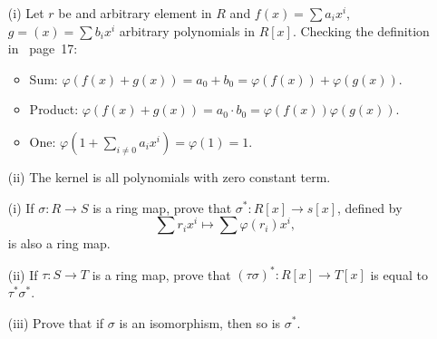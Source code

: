 \begin{myenumerate}
\begin{itemize}
 \item[(i)]
   Let $r$ be and arbitrary element in $R$
   and  \(f(x)=\sum a_ix^i\),  \(g=(x)=\sum b_ix^i\)
   arbitrary polynomials in \(R[x]\).
   Checking the definition in \cite{Rotman98}~page~17:

   \begin{itemize}
    \item
      Sum:
      \(\varphi(f(x)+g(x)) = a_0 + b_0 = \varphi(f(x))+ \varphi(g(x))\).
    \item
      Product:
      \(\varphi(f(x)+g(x)) = a_0 \cdot b_0 = \varphi(f(x))\varphi(g(x))\).
    \item
      One:
      \(\varphi(1+\sum_{i\neq 0} a_ix^i) = \varphi(1) = 1\).
   \end{itemize}
 \item[(ii)]
    The kernel is all polynomials with zero constant term.
\end{itemize}


\item
\begin{excopy} \label{ex:sigstar}
\begin{itemize}
 \item[(i)]
   If \(\sigma: R \rightarrow S\) is a ring map, prove that
   \(\sigma^*: R[x] \rightarrow s[x]\), defined by
   \[ \sum r_i x^i \mapsto \sum \varphi(r_i)x^i,\]
   is also a ring map.
 \item[(ii)]
   If \(\tau: S \rightarrow T\) is a ring map, prove that
   \((\tau\sigma)^*: R[x] \rightarrow T[x]\) is equal to \(\tau^* \sigma^*\).
 \item[(iii)]
   Prove that if \(\sigma\) is an isomorphism, then so is \(\sigma^*\).
\end{itemize}
\end{excopy}


\end{myenumerate}
